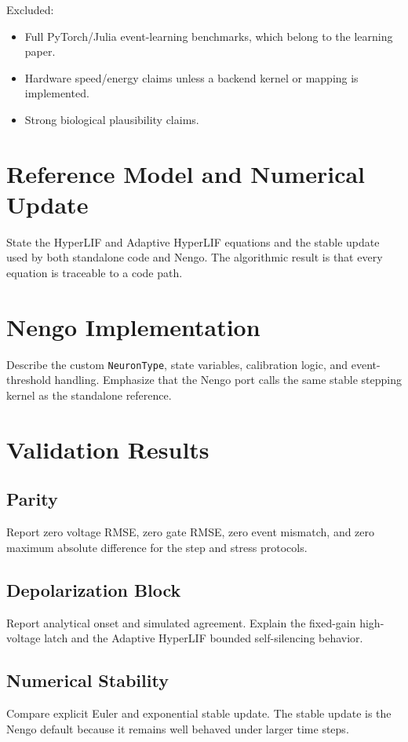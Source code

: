 \documentclass[journal]{IEEEtran}
\begin{document}
Excluded:
\begin{itemize}
  \item Full PyTorch/Julia event-learning benchmarks, which belong to the learning paper.
  \item Hardware speed/energy claims unless a backend kernel or mapping is implemented.
  \item Strong biological plausibility claims.
\end{itemize}

\section{Reference Model and Numerical Update}
State the HyperLIF and Adaptive HyperLIF equations and the stable update used by both standalone code and Nengo. The algorithmic result is that every equation is traceable to a code path.

\section{Nengo Implementation}
Describe the custom \texttt{NeuronType}, state variables, calibration logic, and event-threshold handling. Emphasize that the Nengo port calls the same stable stepping kernel as the standalone reference.

\section{Validation Results}
\subsection{Parity}
Report zero voltage RMSE, zero gate RMSE, zero event mismatch, and zero maximum absolute difference for the step and stress protocols.

\subsection{Depolarization Block}
Report analytical onset and simulated agreement. Explain the fixed-gain high-voltage latch and the Adaptive HyperLIF bounded self-silencing behavior.

\subsection{Numerical Stability}
Compare explicit Euler and exponential stable update. The stable update is the Nengo default because it remains well behaved under larger time steps.
\end{document}
